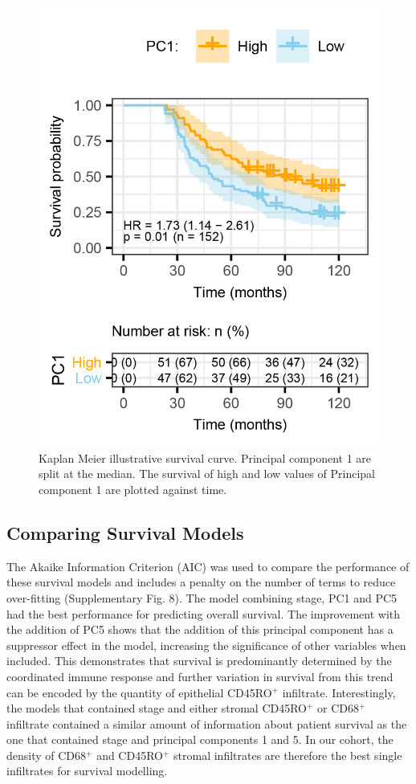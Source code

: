 \begin{figure}
    \centering
    \includegraphics{Chapter2/Figs/Raster/Montfort-2018_Fig7A-PC1.png}
    \caption[Kaplan Meier Curves for Principal Component 1]{Kaplan Meier illustrative survival curve. Principal component 1 are split at the median. The survival of high and low values of Principal component 1 are plotted against time. }
    \label{fig:km_PC}
\end{figure}

\subsection{Comparing Survival Models}
 The Akaike Information Criterion (AIC) was used to compare the performance of these survival models and includes a penalty on the number of terms to reduce over-fitting (Supplementary Fig. 8). The model combining stage, PC1 and PC5 had the best performance for predicting overall survival. The improvement with the addition of PC5 shows that the addition of this principal component has a suppressor effect in the model, increasing the significance of other variables when included. This demonstrates that survival is predominantly determined by the coordinated immune response and further variation in survival from this trend can be encoded by the quantity of epithelial CD45RO$^+$ infiltrate. Interestingly, the models that contained stage and either stromal CD45RO$^+$ or CD68$^+$ infiltrate contained a similar amount of information about patient survival as the one that contained stage and principal components 1 and 5. In our cohort, the density of CD68$^+$ and CD45RO$^+$ stromal infiltrates are therefore the best single infiltrates for survival modelling. 
 
